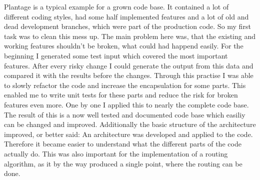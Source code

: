 Plantage is a typical example for a grown code base. It contained a lot of different coding styles, had some half implemented features and a lot of old and dead development branches, which were part of the production code. So my first task was to clean this mess up. The main problem here was, that the existing and working features shouldn't be broken, what could had happend easily. For the beginning I generated some test input which covered the most important features. After every risky change I could generate the output from this data and compared it with the results before the changes. Through this practise I was able to slowly refactor the code and increase the encapsulation for some parts. This enabled me to write unit tests for these parts and reduce the risk for broken features even more. One by one I applied this to nearly the complete code base. The result of this is a now well tested and documented code base which easiliy can be changed and improved. Additionally the basic structure of the architecture improved, or better said: An architecture was developed and applied to the code. Therefore it became easier to understand what the different parts of the code actually do. This was also important for the implementation of a routing algorithm, as it by the way produced a single point, where the routing can be done.
